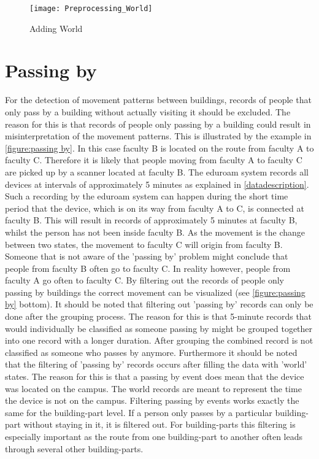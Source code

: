 \begin{figure}[H]
\centering
\texttt{[image: Preprocessing\_World]}
\captionsetup{justification=centering}
\caption{Adding World}
\label{figure:world}
\end{figure}

\section{Passing by}\label{passing by}
For the detection of movement patterns between buildings, records of people that only pass by a building without actually visiting it should be excluded. The reason for this is that records of people only passing by a building could result in misinterpretation of the movement patterns. This is illustrated by the example in \autoref{figure:passing by}. In this case faculty B is located on the route from faculty A to faculty C. Therefore it is likely that people moving from faculty A to faculty C are picked up by a scanner located at faculty B. The eduroam system records all devices at intervals of approximately 5 minutes as explained in \autoref{datadescription}. Such a recording by the eduroam system can happen during the short time period that the device, which is on its way from faculty A to C, is connected at faculty B. This will result in records of approximately 5 minutes at faculty B, whilst the person has not been inside faculty B. As the movement is the change between two states, the movement to faculty C will origin from faculty B. Someone that is not aware of the 'passing by' problem might conclude that people from faculty B often go to faculty C. In reality however, people from faculty A go often to faculty C. By filtering out the records of people only passing by buildings the correct movement can be visualized (see \autoref{figure:passing by} bottom). It should be noted that filtering out 'passing by' records can only be done after the grouping process. The reason for this is that 5-minute records that would individually be classified as someone passing by might be grouped together into one record with a longer duration. After grouping the combined record is not classified as someone who passes by anymore. Furthermore it should be noted that the filtering of 'passing by' records occurs after filling the data with 'world' states. The reason for this is that a passing by event does mean that the device was located on the campus. The world records are meant to represent the time the device is not on the campus. Filtering passing by events works exactly the same for the building-part level. If a person only passes by a particular building-part without staying in it, it is filtered out. For building-parts this filtering is especially important as the route from one building-part to another often leads through several other building-parts. 

